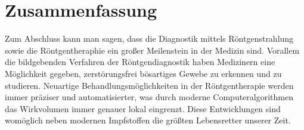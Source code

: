 \section{Zusammenfassung}
Zum Abschluss kann man sagen, dass die Diagnostik mittels Röntgenstrahlung sowie die Röntgentheraphie ein großer Meilenstein in der Medizin sind.
Vorallem die bildgebenden Verfahren der Röntgendiagnostik haben Medizinern eine Möglichkeit gegeben, zerstörungsfrei bösartiges Gewebe zu erkennen und zu studieren.
Neuartige Behandlungsmöglichkeiten in der Röntgentherapie werden immer präziser und automatisierter, was durch moderne Computeralgorithmen das Wirkvolumen immer genauer lokal eingrenzt.
Diese Entwicklungen sind womöglich neben modernen Impfstoffen die größten Lebensretter unserer Zeit. 